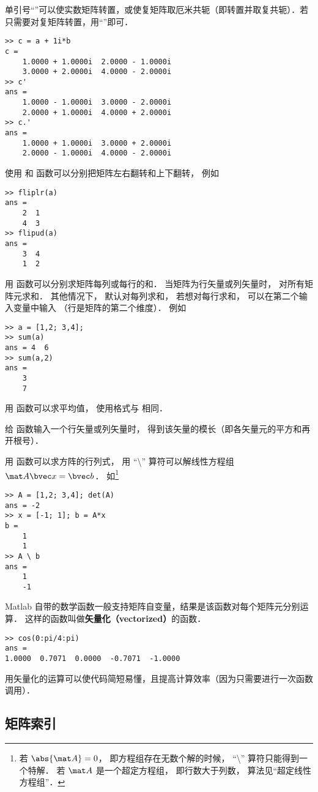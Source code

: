 单引号“”可以使实数矩阵转置，或使复矩阵取厄米共轭（即转置并取复共轭）．若只需要对复矩阵转置，用“”即可．
\begin{lstlisting}[language=MatlabCom]
>> c = a + 1i*b
c =
    1.0000 + 1.0000i  2.0000 - 1.0000i
    3.0000 + 2.0000i  4.0000 - 2.0000i
>> c'
ans =
    1.0000 - 1.0000i  3.0000 - 2.0000i
    2.0000 + 1.0000i  4.0000 + 2.0000i
>> c.'
ans =
    1.0000 + 1.0000i  3.0000 + 2.0000i
    2.0000 - 1.0000i  4.0000 - 2.0000i
\end{lstlisting}
使用  和  函数可以分别把矩阵左右翻转和上下翻转， 例如
\begin{lstlisting}[language=MatlabCom]
>> fliplr(a)
ans =
    2  1
    4  3
>> flipud(a)
ans =
    3  4
    1  2
\end{lstlisting}

用  函数可以分别求矩阵每列或每行的和． 当矩阵为行矢量或列矢量时，  对所有矩阵元求和． 其他情况下，  默认对每列求和， 若想对每行求和， 可以在第二个输入变量中输入  （行是矩阵的第二个维度）． 例如
\begin{lstlisting}[language=MatlabCom]
>> a = [1,2; 3,4];
>> sum(a)
ans = 4  6
>> sum(a,2)
ans =
    3
    7
\end{lstlisting}
用  函数可以求平均值， 使用格式与  相同．

给  函数输入一个行矢量或列矢量时， 得到该矢量的模长（即各矢量元的平方和再开根号）． 

用  函数可以求方阵的行列式， 用 “\textbackslash” 算符可以解线性方程组%
 $\mat A \bvec x = \bvec b$． 如\footnote{若 $\abs{\mat A} = 0$， 即方程组存在无数个解的时候， “\textbackslash” 算符只能得到一个特解． 若 $\mat A$ 是一个超定方程组， 即行数大于列数， 算法见“超定线性方程组”．}
\begin{lstlisting}[language=MatlabCom]
>> A = [1,2; 3,4]; det(A)
ans = -2
>> x = [-1; 1]; b = A*x
b =
    1
    1
>> A \ b
ans =
    1
    -1
\end{lstlisting}

Matlab 自带的数学函数一般支持矩阵自变量，结果是该函数对每个矩阵元分别运算． 这样的函数叫做\textbf{矢量化（vectorized）}的函数．
\begin{lstlisting}[language=MatlabCom]
>> cos(0:pi/4:pi)
ans =
1.0000  0.7071  0.0000  -0.7071  -1.0000
\end{lstlisting}
用矢量化的运算可以使代码简短易懂，且提高计算效率（因为只需要进行一次函数调用）．

\subsection{矩阵索引}

